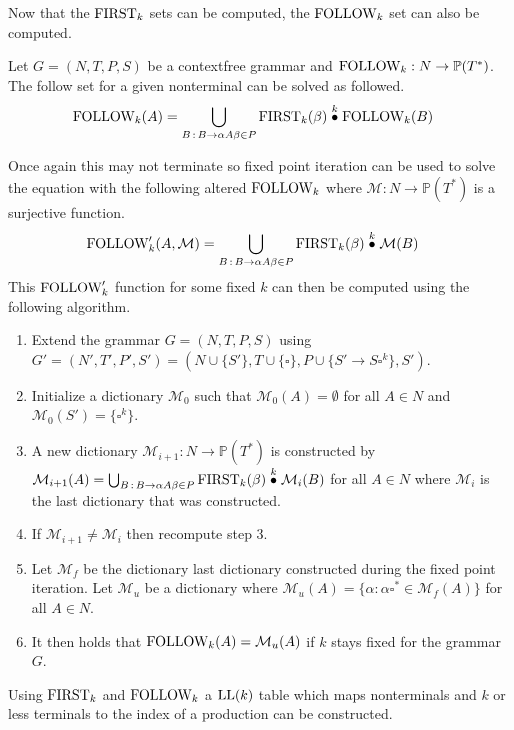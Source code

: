 Now that the $\text{FIRST}_k$ sets can be computed, the $\text{FOLLOW}_k$ set can also be computed. 
\begin{algorithm}
    \label{algorithm:follow}
    Let $G = (N, T, P, S)$ be a context\-free grammar and $\text{FOLLOW}_k: N \to \mathbb{P}(T^*)$. The follow set for a given nonterminal can be solved as followed.
    \begin{align*}
        \FOLLOW_k(A) &= \bigcup_{B \, : \, B \to \alpha A \beta \in P} \FIRST_k(\beta) \truncprod{k} \FOLLOW_k(B)
    \end{align*}
\end{algorithm}
\noindent Once again this may not terminate so fixed point iteration can be used to solve the equation with the following altered $\text{FOLLOW}_k$ where $\mathcal{M}: N \to \mathbb{P}(T^*)$ is a surjective function.
\begin{align*}
    \FOLLOW'_k(A, \mathcal{M}) &= \bigcup_{B \,: \, B \to \alpha A \beta \in P} \FIRST_k(\beta) \truncprod{k} \mathcal{M}(B)
\end{align*}
This $\text{FOLLOW}'_k$ function for some fixed $k$ can then be computed using the following algorithm.
\begin{enumerate}
    \item Extend the grammar $G = (N, T, P, S)$ using $G' = (N', T', P', S') = (N \cup \{S'\}, T \cup \{\square\}, P \cup \{S' \to S \square^k\}, S')$.
    \item Initialize a dictionary $\mathcal{M}_0$ such that $\mathcal{M}_0(A) = \emptyset$ for all $A \in N$ and $\mathcal{M}_0(S') = \{\square^k\}$.
    \item A new dictionary $\mathcal{M}_{i+1}: N \to \mathbb{P}(T^*)$ is constructed by $\mathcal{M}_{i+1}(A) = \bigcup_{B \,: \, B \to  \alpha A \beta \in P} \FIRST_k(\beta) \truncprod{k} \mathcal{M}_{i}(B)$ for all $A \in N$ where $\mathcal{M}_{i}$ is the last dictionary that was constructed.
    \item If $\mathcal{M}_{i+1} \neq \mathcal{M}_{i}$ then recompute step 3.
    \item Let $\mathcal{M}_f$ be the dictionary last dictionary constructed during the fixed point iteration. Let $\mathcal{M}_u$ be a dictionary where $\mathcal{M}_u(A) = \{\alpha : \alpha \square^* \in \mathcal{M}_f(A)\}$ for all $A \in N$.
    \item It then holds that $\text{FOLLOW}_k(A) = \mathcal{M}_u(A)$ if $k$ stays fixed for the grammar $G$.
\end{enumerate}
Using $\text{FIRST}_k$ and $\text{FOLLOW}_k$ a $\text{LL}(k)$ table which maps nonterminals and $k$ or less terminals to the index of a production can be constructed.
